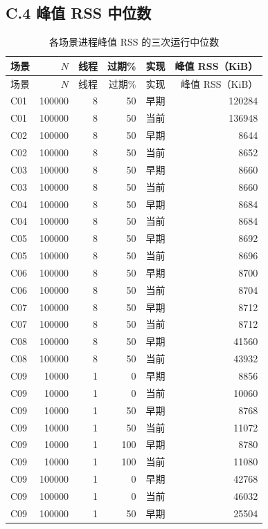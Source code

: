 \documentclass[UTF8,a4paper,10pt,twocolumn,fontset=fandol]{ctexart}
\begin{document}
\subsection*{C.4 峰值 RSS 中位数}
\begingroup\small
\setlength{\tabcolsep}{7pt}
\begin{longtable}{@{}lrrrlr@{}}
\caption{各场景进程峰值 RSS 的三次运行中位数}\\
\toprule
场景 & $N$ & 线程 & 过期\% & 实现 & 峰值 RSS（KiB） \\
\midrule
\endfirsthead
\toprule
场景 & $N$ & 线程 & 过期\% & 实现 & 峰值 RSS（KiB） \\
\midrule
\endhead
\bottomrule
\endfoot
C01 & 100000 & 8 & 50 & 早期 & 120284 \\
C01 & 100000 & 8 & 50 & 当前 & 136948 \\
C02 & 100000 & 8 & 50 & 早期 & 8644 \\
C02 & 100000 & 8 & 50 & 当前 & 8652 \\
C03 & 100000 & 8 & 50 & 早期 & 8660 \\
C03 & 100000 & 8 & 50 & 当前 & 8660 \\
C04 & 100000 & 8 & 50 & 早期 & 8684 \\
C04 & 100000 & 8 & 50 & 当前 & 8684 \\
C05 & 100000 & 8 & 50 & 早期 & 8692 \\
C05 & 100000 & 8 & 50 & 当前 & 8696 \\
C06 & 100000 & 8 & 50 & 早期 & 8700 \\
C06 & 100000 & 8 & 50 & 当前 & 8704 \\
C07 & 100000 & 8 & 50 & 早期 & 8712 \\
C07 & 100000 & 8 & 50 & 当前 & 8712 \\
C08 & 100000 & 8 & 50 & 早期 & 41560 \\
C08 & 100000 & 8 & 50 & 当前 & 43932 \\
C09 & 10000 & 1 & 0 & 早期 & 8856 \\
C09 & 10000 & 1 & 0 & 当前 & 10060 \\
C09 & 10000 & 1 & 50 & 早期 & 8768 \\
C09 & 10000 & 1 & 50 & 当前 & 11072 \\
C09 & 10000 & 1 & 100 & 早期 & 8780 \\
C09 & 10000 & 1 & 100 & 当前 & 11080 \\
C09 & 100000 & 1 & 0 & 早期 & 42768 \\
C09 & 100000 & 1 & 0 & 当前 & 46032 \\
C09 & 100000 & 1 & 50 & 早期 & 25504 \\

\end{longtable}
\end{document}
